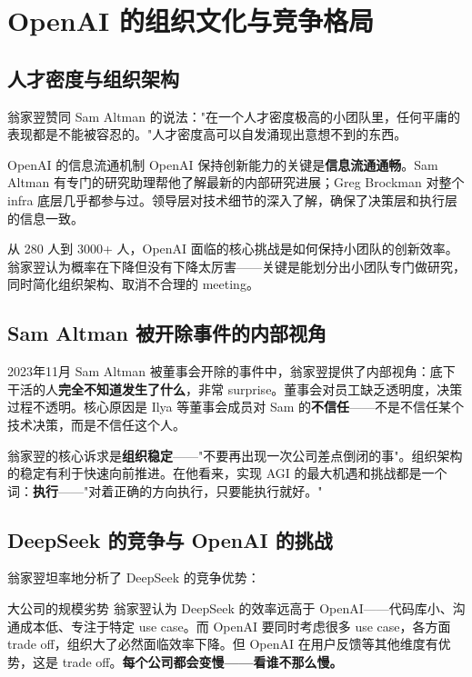 \section{OpenAI 的组织文化与竞争格局}

\subsection{人才密度与组织架构}

翁家翌赞同 Sam Altman 的说法："在一个人才密度极高的小团队里，任何平庸的表现都是不能被容忍的。"人才密度高可以自发涌现出意想不到的东西。

\begin{knowledgebox}{OpenAI 的信息流通机制}
OpenAI 保持创新能力的关键是\textbf{信息流通通畅}。Sam Altman 有专门的研究助理帮他了解最新的内部研究进展；Greg Brockman 对整个 infra 底层几乎都参与过。领导层对技术细节的深入了解，确保了决策层和执行层的信息一致。
\end{knowledgebox}

从 280 人到 3000+ 人，OpenAI 面临的核心挑战是如何保持小团队的创新效率。翁家翌认为概率在下降但没有下降太厉害——关键是能划分出小团队专门做研究，同时简化组织架构、取消不合理的 meeting。

\subsection{Sam Altman 被开除事件的内部视角}

2023年11月 Sam Altman 被董事会开除的事件中，翁家翌提供了内部视角：底下干活的人\textbf{完全不知道发生了什么}，非常 surprise。董事会对员工缺乏透明度，决策过程不透明。核心原因是 Ilya 等董事会成员对 Sam 的\textbf{不信任}——不是不信任某个技术决策，而是不信任这个人。

翁家翌的核心诉求是\textbf{组织稳定}——"不要再出现一次公司差点倒闭的事"。组织架构的稳定有利于快速向前推进。在他看来，实现 AGI 的最大机遇和挑战都是一个词：\textbf{执行}——"对着正确的方向执行，只要能执行就好。"

\subsection{DeepSeek 的竞争与 OpenAI 的挑战}

翁家翌坦率地分析了 DeepSeek 的竞争优势：

\begin{warningbox}{大公司的规模劣势}
翁家翌认为 DeepSeek 的效率远高于 OpenAI——代码库小、沟通成本低、专注于特定 use case。而 OpenAI 要同时考虑很多 use case，各方面 trade off，组织大了必然面临效率下降。但 OpenAI 在用户反馈等其他维度有优势，这是 trade off。\textbf{每个公司都会变慢——看谁不那么慢。}
\end{warningbox}

